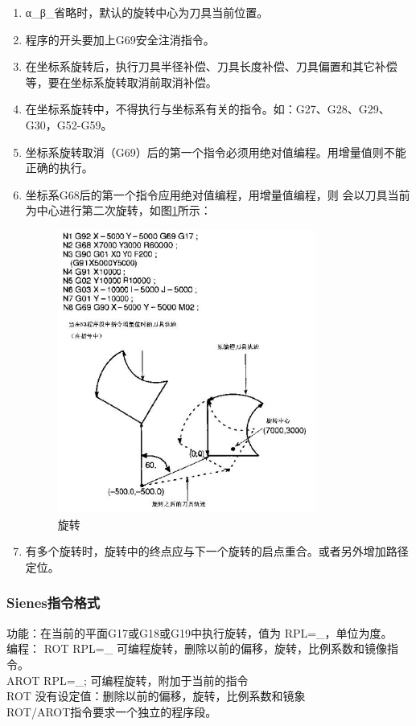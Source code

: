 \begin{enumerate}[A、]
	\item α\_β\_省略时，默认的旋转中心为刀具当前位置。
\item 程序的开头要加上G69安全注消指令。
\item 在坐标系旋转后，执行刀具半径补偿、刀具长度补偿、刀具偏置和其它补偿等，要在坐标系旋转取消前取消补偿。
\item 在坐标系旋转中，不得执行与坐标系有关的指令。如：G27、G28、G29、G30，G52-G59。
\item  坐标系旋转取消（G69）后的第一个指令必须用绝对值编程。用增量值则不能正确的执行。
\item 坐标系G68后的第一个指令应用绝对值编程，用增量值编程，则    会以刀具当前为中心进行第二次旋转，如图\ref{旋转}所示：
\begin{figure}
	\centering	\includegraphics[width=0.8\textwidth]{images/7-1}
	\caption{旋转} \label{旋转}
\end{figure}
\item 有多个旋转时，旋转中的终点应与下一个旋转的启点重合。或者另外增加路径定位。
\end{enumerate}
\subsubsection{Sienes指令格式}
功能：在当前的平面G17或G18或G19中执行旋转，值为 RPL=\_，单位为度。\\
编程：    ROT RPL=\_  可编程旋转，删除以前的偏移，旋转，比例系数和镜像指令。\\
AROT RPL=\_; 可编程旋转，附加于当前的指令\\
ROT    没有设定值：删除以前的偏移，旋转，比例系数和镜象\\
ROT/AROT指令要求一个独立的程序段。

